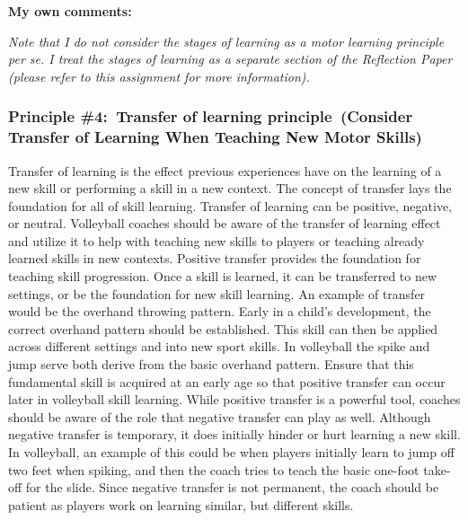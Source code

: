 \documentclass[
  letterpaper,
  DIV=11,
  numbers=noendperiod]{scrartcl}
\begin{document}
\textbf{My own comments:}

\emph{Note that I do not consider the stages of learning as a motor
learning principle per se. I treat the stages of learning as a separate
section of the Reflection Paper (please refer to this assignment for
more information).}

\hypertarget{principle-4-transfer-of-learning-principle-consider-transfer-of-learning-when-teaching-new-motor-skills}{%
\subsubsection{\texorpdfstring{\textbf{Principle \#4:~Transfer of
learning principle~(Consider Transfer of Learning When Teaching New
Motor
Skills)}}{Principle \#4:~Transfer of learning principle~(Consider Transfer of Learning When Teaching New Motor Skills)}}\label{principle-4-transfer-of-learning-principle-consider-transfer-of-learning-when-teaching-new-motor-skills}}

Transfer of learning is the effect previous experiences have on the
learning of a new skill or performing a skill in a new context. The
concept of transfer lays the foundation for all of skill learning.
Transfer of learning can be positive, negative, or neutral. Volleyball
coaches should be aware of the transfer of learning effect and utilize
it to help with teaching new skills to players or teaching already
learned skills in new contexts. Positive transfer provides the
foundation for teaching skill progression. Once a skill is learned, it
can be transferred to new settings, or be the foundation for new skill
learning. An example of transfer would be the overhand throwing pattern.
Early in a child's development, the correct overhand pattern should be
established. This skill can then be applied across different settings
and into new sport skills. In volleyball the spike and jump serve both
derive from the basic overhand pattern. Ensure that this fundamental
skill is acquired at an early age so that positive transfer can occur
later in volleyball skill learning. While positive transfer is a
powerful tool, coaches should be aware of the role that negative
transfer can play as well. Although negative transfer is temporary, it
does initially hinder or hurt learning a new skill. In volleyball, an
example of this could be when players initially learn to jump off two
feet when spiking, and then the coach tries to teach the basic one-foot
take-off for the slide. Since negative transfer is not permanent, the
coach should be patient as players work on learning similar, but
different skills.
\end{document}

